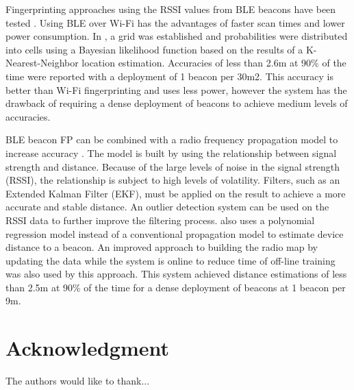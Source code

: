 \documentclass[conference]{IEEEtran}
\begin{document}
Fingerprinting approaches using the RSSI values from BLE beacons have been tested \cite{faragher2015location}. Using BLE over Wi-Fi has the advantages of faster scan times and lower power consumption. In \cite{faragher2015location}, a grid was established and probabilities were distributed into cells using a Bayesian likelihood function based on the results of a K-Nearest-Neighbor location estimation. Accuracies of less than 2.6m at 90\% of the time were reported with a deployment of 1 beacon per 30m2. This accuracy is better than Wi-Fi fingerprinting and uses less power, however the  system has the drawback of requiring a dense deployment of beacons to achieve medium levels of accuracies.

BLE beacon FP can be combined with a radio frequency propagation model to increase accuracy \cite{zhuang2016smartphone}. The model is built by using the relationship between signal strength and distance. Because of the large levels of noise in the signal strength (RSSI), the relationship is subject to high levels of volatility. Filters, such as an Extended Kalman Filter (EKF), must be applied on the result to achieve a more accurate and stable distance. An outlier detection system can be used on the RSSI data to further improve the filtering process. \cite{zhuang2016smartphone} also uses a polynomial regression model instead of a conventional propagation model to estimate device distance to a beacon. An improved approach to building the radio map by updating the data while the system is online to reduce time of off-line training was also used by this approach. This system achieved distance estimations of less than 2.5m at 90\% of the time for a dense deployment of beacons at 1 beacon per 9m.

\section*{Acknowledgment}


The authors would like to thank...








\end{document}
